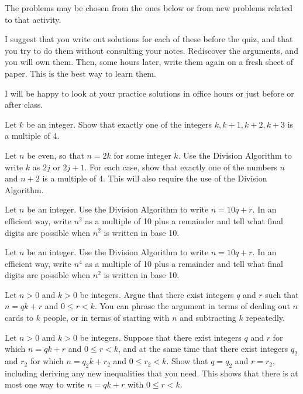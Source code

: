 
The problems may be chosen from the ones below or from new problems related to that activity.

I suggest that you write out solutions for each of these before the quiz, and that you try to do them without consulting your notes.
Rediscover the arguments, and you will own them.
Then, some hours later, write them again on a fresh sheet of paper.
This is the best way to learn them.

I will be happy to look at your practice solutions in office hours or just before or after class.

\blist{0.2in}
\item Let $k$ be an integer.
Show that exactly one of the integers $k, k+1, k+2, k+3$ is a multiple of 4.

\item Let $n$ be even, so that $n = 2k$ for some integer $k$.
Use the Division Algorithm to write $k$ as $2j$ or $2j+1$.
For each case, show that exactly one of the numbers $n$ and $n+2$ is a multiple of 4.
This will also require the use of the Division Algorithm.

\item Let $n$ be an integer.  Use the Division Algorithm to write $n = 10q + r$.  In an efficient way, write $n^2$ as a multiple of 10 plus a remainder and tell what final digits are possible when $n^2$ is written in base 10.

\item Let $n$ be an integer.  Use the Division Algorithm to write $n = 10q + r$.  In an efficient way, write $n^4$ as a multiple of 10 plus a remainder and tell what final digits are possible when $n^2$ is written in base 10.

\item Let $n > 0$ and $k > 0$ be integers.
Argue that there exist integers $q$ and $r$ such that $n = qk + r$ and $0 \leq r < k$.
You can phrase the argument in terms of dealing out $n$ cards to $k$ people, or in terms of starting with $n$ and subtracting $k$ repeatedly.

\item Let $n > 0$ and $k > 0$ be integers.
Suppose that there exist integers $q$ and $r$ for which $n = qk + r$ and $0 \leq r < k$, and at the same time that there exist integers $q_2$ and $r_2$ for which $n = q_2 k + r_2$ and $0 \leq r_2 < k$.
Show that $q = q_2$ and $r = r_2$, including deriving any new inequalities that you need.
This shows that there is at most one way to write $n = qk + r$ with $0 \leq r < k$.

